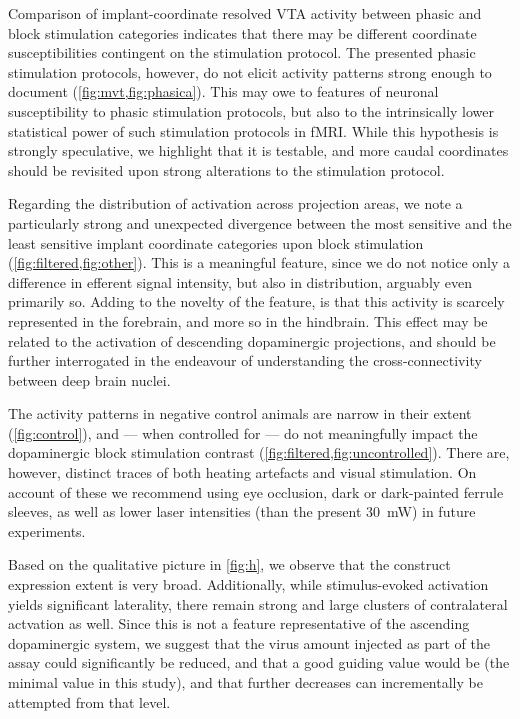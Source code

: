 Comparison of implant-coordinate resolved VTA activity between phasic and block stimulation categories indicates that there may be different coordinate susceptibilities contingent on the stimulation protocol.
The presented phasic stimulation protocols, however, do not elicit activity patterns strong enough to document (\cref{fig:mvt,fig:phasica}).
This may owe to features of neuronal susceptibility to phasic stimulation protocols, but also to the intrinsically lower statistical power of such stimulation protocols in fMRI.
While this hypothesis is strongly speculative, we highlight that it is testable, and more caudal coordinates should be revisited upon strong alterations to the stimulation protocol.

Regarding the distribution of activation across projection areas, we note a particularly strong and unexpected divergence between the most sensitive and the least sensitive implant coordinate categories upon block stimulation (\cref{fig:filtered,fig:other}).
This is a meaningful feature, since we do not notice only a difference in efferent signal intensity, but also in distribution, arguably even primarily so.
Adding to the novelty of the feature, is that this activity is scarcely represented in the forebrain, and more so in the hindbrain.
This effect may be related to the activation of descending dopaminergic projections, and should be further interrogated in the endeavour of understanding the cross-connectivity between deep brain nuclei.

The activity patterns in negative control animals are narrow in their extent (\cref{fig:control}), and --- when controlled for --- do not meaningfully impact the dopaminergic block stimulation contrast (\cref{fig:filtered,fig:uncontrolled}).
There are, however, distinct traces of both heating artefacts and visual stimulation.
On account of these we recommend using eye occlusion, dark or dark-painted ferrule sleeves, as well as lower laser intensities (than the present \SI{30}{\milli\watt}) in future experiments.

Based on the qualitative picture in \cref{fig:h}, we observe that the construct expression extent is very broad.
Additionally, while stimulus-evoked activation yields significant laterality, there remain strong and large clusters of contralateral actvation as well.
Since this is not a feature representative of the ascending dopaminergic system, we suggest that the virus amount injected as part of the assay could significantly be reduced, and that a good guiding value would be
 (the minimal value in this study),
and that further decreases can incrementally be attempted from that level.


